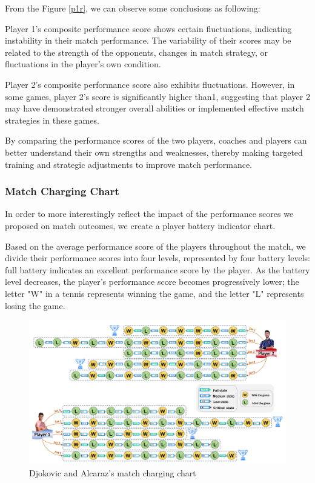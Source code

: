 \documentclass[12pt]{article}%
\begin{document}
From the Figure \ref{p1r}, we can observe some conclusions as following:

 Player 1's composite performance score shows certain fluctuations, indicating instability in their match performance. The variability of their scores may be related to the strength of the opponents, changes in match strategy, or fluctuations in the player's own condition.

Player 2's composite performance score also exhibits fluctuations. However, in some games, player 2's score is significantly higher than1, suggesting that player 2 may have demonstrated stronger overall abilities or implemented effective match strategies in these games.

By comparing the performance scores of the two players, coaches and players can better understand their own strengths and weaknesses, thereby making targeted training and strategic adjustments to improve match performance.



\subsubsection{Match Charging Chart}

In order to more interestingly reflect the impact of the performance scores we proposed on match outcomes, we create a player battery indicator chart.

Based on the average performance score of the players throughout the match, we divide their performance scores into four levels, represented by four battery levels: full battery indicates an excellent performance score by the player. As the battery level decreases, the player's performance score becomes progressively lower; the letter "W" in a tennis represents winning the game, and the letter "L" represents losing the game.


\begin{figure}[H]
	\centering
	\includegraphics[scale=0.5]{figure//1r3.jpg}
	\caption{Djokovic and Alcaraz's match charging chart}
	\label{r3}
\end{figure}
\end{document}
